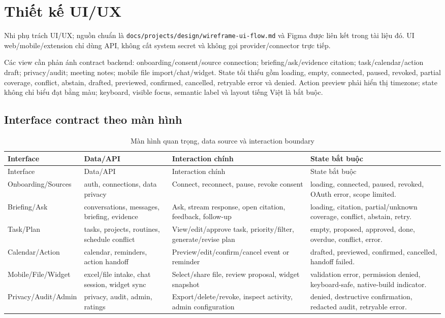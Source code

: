 \documentclass[12pt,a4paper]{article}
\begin{document}
\section{Thiết kế UI/UX}
Nhi phụ trách UI/UX; nguồn chuẩn là \texttt{docs/projects/design/wireframe-ui-flow.md}
và Figma được liên kết trong tài liệu đó. UI web/mobile/extension chỉ dùng API,
không cất system secret và không gọi provider/connector trực tiếp.

Các view cần phản ánh contract backend: onboarding/consent/source connection;
briefing/ask/evidence citation; task/calendar/action draft; privacy/audit;
meeting notes; mobile file import/chat/widget. State tối thiểu gồm loading,
empty, connected, paused, revoked, partial coverage, conflict, abstain,
drafted, previewed, confirmed, cancelled, retryable error và denied. Action
preview phải hiển thị timezone; state không chỉ biểu đạt bằng màu; keyboard,
visible focus, semantic label và layout tiếng Việt là bắt buộc.

\subsection{Interface contract theo màn hình}
\begin{longtable}{p{3.0cm}p{3.7cm}p{4.0cm}p{3.5cm}}
\caption{Màn hình quan trọng, data source và interaction boundary}\label{tab:sdd-ui-contract}\\
\toprule Interface & Data/API & Interaction chính & State bắt buộc \\ \midrule
\endfirsthead
\toprule Interface & Data/API & Interaction chính & State bắt buộc \\ \midrule
\endhead
Onboarding/Sources & auth, connections, data privacy & Connect, reconnect, pause, revoke consent & loading, connected, paused, revoked, OAuth error, scope limited. \\
Briefing/Ask & conversations, messages, briefing, evidence & Ask, stream response, open citation, feedback, follow-up & loading, citation, partial/unknown coverage, conflict, abstain, retry. \\
Task/Plan & tasks, projects, routines, schedule conflict & View/edit/approve task, priority/filter, generate/revise plan & empty, proposed, approved, done, overdue, conflict, error. \\
Calendar/Action & calendar, reminders, action handoff & Preview/edit/confirm/cancel event or reminder & drafted, previewed, confirmed, cancelled, handoff failed. \\
Mobile/File/Widget & excel/file intake, chat session, widget sync & Select/share file, review proposal, widget snapshot & validation error, permission denied, keyboard-safe, native-build indicator. \\
Privacy/Audit/Admin & privacy, audit, admin, ratings & Export/delete/revoke, inspect activity, admin configuration & denied, destructive confirmation, redacted audit, retryable error. \\
\bottomrule
\end{longtable}
\end{document}
